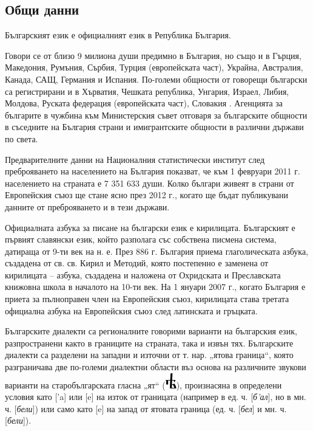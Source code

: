 \documentclass[]{../../metanetpaper}
\begin{document}
\begin{multicols}{2}

\subsection{Общи данни}
Българският език е официалният език в Република България.

Говори се от близо 9 милиона души предимно в
 България, но също и в Гърция, Македония, Румъния,
 Сърбия, Турция (европейската
 част), Украйна, Австралия, Канада, САЩ, Германия и Испания. По-големи общности от говорещи български
 са регистрирани и в Хърватия, Чешката република,
 Унгария, Израел, Либия, Молдова, Руската федерация
 (европейската част), Словакия \cite{Ethno}. Агенцията за българите
 в чужбина \cite{ABA} към Министерския съвет отговаря за
 българските общности в съседните на България страни и имигрантските общности в различни държави по света.

Предварителните данни на Националния статистически
 институт \cite{NSI} след преброяването на населението на
 България показват, че към 1 февруари 2011 г.
 населението на страната е 7 351 633 души. Колко
 българи живеят в страни от Европейския съюз ще стане
 ясно през 2012 г., когато ще бъдат публикувани данните
 от преброяването и в тези държави.

Официалната азбука за писане на български език е кирилицата. Българският е първият славянски език, който разполага със собствена писмена система, датираща от 9-ти век на н. е. През 886 г. България приема глаголическата азбука, създадена от св.
 св. Кирил и Методий, която постепенно е заменена от кирилицата
 – азбука, създадена и наложена от Охридската и
 Преславската книжовна школа в началото на 10-ти век. На 1
 януари 2007 г., когато България е приета за пълноправен
 член на Европейския съюз, кирилицата става третата
 официална азбука на Европейския съюз след латинската
 и гръцката.

Българските диалекти са регионалните говорими варианти на българския език, разпространени
 както в границите на страната, така и извън тях. Българските диалекти са разделени на западни и
 източни от т. нар. „ятова граница“, която разграничава
 две по-големи диалектни области въз основа на
 различните звукови варианти на старобългарската
 гласна „ят“ (\includegraphics[scale=0.32]{../_media/bulgarian/yat}), произнасяна в определени условия като
 ['a] или [e] на изток от границата (например в ед. ч.
 [{\it б'ал}], но в мн. ч. [{\it бели}]) или само като [e] на запад от
 ятовата граница (ед. ч. [{\it бел}] и мн. ч. [{\it бели}]).


\end{multicols}
\end{document}
